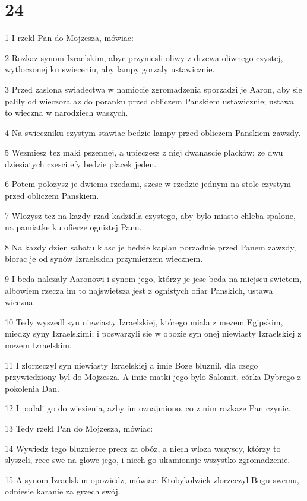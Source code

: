 \chapter{24}

\par 1 I rzekl Pan do Mojzesza, mówiac:
\par 2 Rozkaz synom Izraelskim, abyc przyniesli oliwy z drzewa oliwnego czystej, wytloczonej ku swieceniu, aby lampy gorzaly ustawicznie.
\par 3 Przed zaslona swiadectwa w namiocie zgromadzenia sporzadzi je Aaron, aby sie palily od wieczora az do poranku przed obliczem Panskiem ustawicznie; ustawa to wieczna w narodziech waszych.
\par 4 Na swieczniku czystym stawiac bedzie lampy przed obliczem Panskiem zawzdy.
\par 5 Wezmiesz tez maki pszennej, a upieczesz z niej dwanascie placków; ze dwu dziesiatych czesci efy bedzie placek jeden.
\par 6 Potem polozysz je dwiema rzedami, szesc w rzedzie jednym na stole czystym przed obliczem Panskiem.
\par 7 Wlozysz tez na kazdy rzad kadzidla czystego, aby bylo miasto chleba spalone, na pamiatke ku ofierze ognistej Panu.
\par 8 Na kazdy dzien sabatu klasc je bedzie kaplan porzadnie przed Panem zawzdy, biorac je od synów Izraelskich przymierzem wiecznem.
\par 9 I beda nalezaly Aaronowi i synom jego, którzy je jesc beda na miejscu swietem, albowiem rzecza im to najswietsza jest z ognistych ofiar Panskich, ustawa wieczna.
\par 10 Tedy wyszedl syn niewiasty Izraelskiej, którego miala z mezem Egipskim, miedzy syny Izraelskimi; i poswarzyli sie w obozie syn onej niewiasty Izraelskiej z mezem Izraelskim.
\par 11 I zlorzeczyl syn niewiasty Izraelskiej a imie Boze bluznil, dla czego przywiedziony byl do Mojzesza. A imie matki jego bylo Salomit, córka Dybrego z pokolenia Dan.
\par 12 I podali go do wiezienia, azby im oznajmiono, co z nim rozkaze Pan czynic.
\par 13 Tedy rzekl Pan do Mojzesza, mówiac:
\par 14 Wywiedz tego bluznierce precz za obóz, a niech wloza wszyscy, którzy to slyszeli, rece swe na glowe jego, i niech go ukamionuje wszystko zgromadzenie.
\par 15 A synom Izraelskim opowiedz, mówiac: Ktobykolwiek zlorzeczyl Bogu swemu, odniesie karanie za grzech swój.
